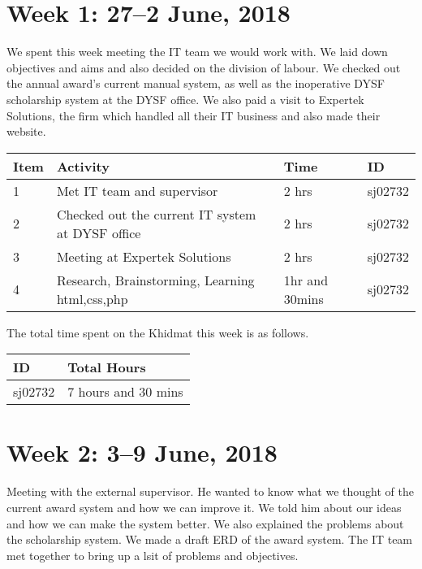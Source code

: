 \documentclass{article}
\begin{document}
\section*{Week 1: 27--2 June, 2018}

We spent this week meeting the IT team we would work with. We laid down objectives and aims and also decided on the division of labour. We checked out the annual award's current manual system, as well as the inoperative DYSF scholarship system at the DYSF office. We also paid a visit to Expertek Solutions, the firm which handled all their IT business and also made their website. \newline

\begin{tabular}{|l|l|l|l|}
  \hline
  Item 	& Activity & Time & ID \\\hline\hline
  1	& Met IT team and supervisor & 2 hrs & sj02732 \\\hline
  2	& Checked out the current IT system at DYSF office & 2 hrs & sj02732 \\\hline
  3	& Meeting at Expertek Solutions & 2 hrs & sj02732 \\\hline
  4 & Research, Brainstorming, Learning html,css,php & 1hr and 30mins & sj02732  \\\hline
\end{tabular}
\newline
The total time spent on the Khidmat this week is as follows.

\begin{tabular}{|l|l|}
  \hline
  ID & Total Hours\\\hline\hline
  sj02732 & 7 hours and 30 mins\\\hline
\end{tabular}

\newpage %
\section*{Week 2: 3--9 June, 2018}

Meeting with the external supervisor. He wanted to know what we thought of the current award system and how we can improve it. We told him about our ideas and how we can make the system better. We also explained the problems about the scholarship system. We made a draft ERD of the award system. The IT team met together to bring up a lsit of problems and objectives. \newline
\end{document}
